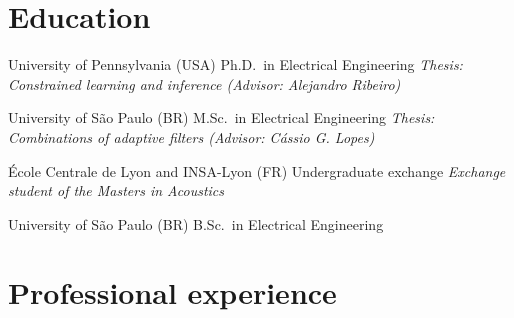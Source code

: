 \documentclass{cvlfoc}
\begin{document}
\section*{Education}

\begin{entrydate}
		{University of Pennsylvania (USA)}
		{Ph.D.\ in Electrical Engineering}
		{\emph{Thesis: Constrained learning and inference
			\hfill(Advisor: Alejandro Ribeiro)}}

		{University of S\~{a}o Paulo (BR)}
		{M.Sc.\ in Electrical Engineering}
		{\emph{Thesis: Combinations of adaptive filters
			\hfill(Advisor: C\'{a}ssio G. Lopes)}}

		{École Centrale de Lyon {\normalfont and} INSA-Lyon (FR)}
		{Undergraduate exchange}
		{\textit{Exchange student of the Masters in Acoustics}}

		{University of S\~{a}o Paulo (BR)}
		{B.Sc.\ in Electrical Engineering}
		{}
\end{entrydate}



\section*{Professional experience}
\end{document}
